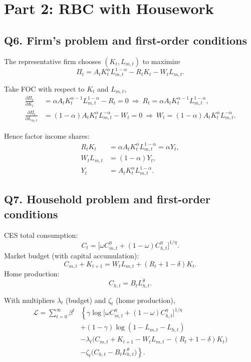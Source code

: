 \documentclass[a4paper,12pt]{article} %
\theoremstyle{nonitalic}
\begin{document}
\section*{Part 2: RBC with Housework}
\subsection*{Q6. Firm's problem and first-order conditions}
The representative firm chooses $(K_t,L_{m,t})$ to maximize
\[
\Pi_t = A_t K_t^{\alpha} L_{m,t}^{1-\alpha} - R_t K_t - W_t L_{m,t}.
\]

Take FOC with respect to $K_t$ and $L_{m,t}$,
\begin{align}
\frac{\partial \Pi_t}{\partial K_t}
&= \alpha A_t K_t^{\alpha-1} L_{m,t}^{1-\alpha} - R_t
= 0
\ \Longrightarrow\
R_t=\alpha A_t K_t^{\alpha-1} L_{m,t}^{1-\alpha},\\
\frac{\partial \Pi_t}{\partial L_{m,t}}
&= (1-\alpha) A_t K_t^{\alpha} L_{m,t}^{-\alpha} - W_t
= 0
\ \Longrightarrow\
W_t=(1-\alpha) A_t K_t^{\alpha} L_{m,t}^{-\alpha}.
\end{align}

Hence factor income shares:
\begin{align}
R_t K_t &= \alpha A_t K_t^{\alpha} L_{m,t}^{1-\alpha} = \alpha Y_t,\\
W_t L_{m,t} &= (1-\alpha)Y_t, \\
Y_t &= A_t K_t^{\alpha} L_{m,t}^{1-\alpha}.
\end{align}


\subsection*{Q7. Household problem and first-order conditions}

CES total consumption:
\[
C_t=\big[\omega C_{m,t}^{\eta}+(1-\omega)C_{h,t}^{\eta}\big]^{1/\eta}.
\]
Market budget (with capital accumulation):
\[
C_{m,t}+K_{t+1}=W_t L_{m,t}+(R_t+1-\delta)K_t.
\]
Home production:
\[
C_{h,t}=B_t L_{h,t}^{\theta}.
\]

With multipliers $\lambda_t$ (budget) and $\zeta_t$ (home production),
\begin{align}
  \mathcal{L}
= \sum_{t=0}^{\infty}\beta^t & \left\{ \gamma\log\!\big[\omega C_{m,t}^{\eta}+(1-\omega)C_{h,t}^{\eta}\big]^{1/\eta} \right. \\
&+(1-\gamma)\log(1-L_{m,t}-L_{h,t}) \\
&-\lambda_t\big(C_{m,t}+K_{t+1}-W_tL_{m,t}-(R_t+1-\delta)K_t\big) \\
& \left. -\zeta_t\big(C_{h,t}-B_t L_{h,t}^{\theta}\big) \right\}.
\end{align}
\end{document}
